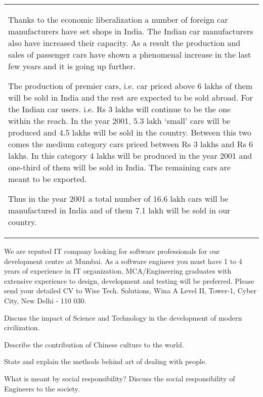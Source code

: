   \begin{tabular}{p{\textwidth- 2cm}}
    
    Thanks to the economic liberalization a number of foreign car manufacturers have set shops in India.
    The Indian car manufacturers also have increased their capacity. As a result the production and sales
    of passenger cars have shown a phenomenal increase in the last few years and it is going up further.

    The production of premier cars, i.e. car priced above 6 lakhs of them will be sold in India and the
    rest are expected to be sold abroad. For the Indian car users. i.e. Rs 3 lakhs will continue to be
    the one within the reach. In the year 2001, 5.3 lakh `small' cars will be produced
    and 4.5 lakhs will be sold in the country. Between this two comes the medium
    category cars priced between Rs 3 lakhs and Rs 6 lakhs. In this category 4 lakhs will
    be produced in the year 2001
    and one-third of them will be sold in India. The remaining cars are meant to be exported.

    Thus in the year 2001 a total number of 16.6 lakh cars will be manufactured in India and of them
    7.1 lakh will be sold in our country.
    
  \end{tabular}
\Or
\item We are reputed IT company looking for software professionals for our development centre at
  Mumbai. As a software engineer you must have 1 to 4 years of experience in IT organization, 
  MCA/Engineering graduates with extensive experience to design, development and testing will be 
  preferred. Please send your detailed CV to Wise Tech. Solutions, Wina A Level II, Tower-1, Cyber
  City, New Delhi - 110 030.
\ene

\item \iitem Discuss the impact of Science and Technology in the development of modern civilization.
\Or
\item Describe the contribution of Chinese culture to the world.
\ene

\item \iitem State and explain the methods behind art of dealing with people.
\Or
\item What is meant by social responsibility? Discuss the social responsibility of Engineers 
  to the society.
\ene

\markC
\ene

\newpage

\sub{\subj}
\maxtime

